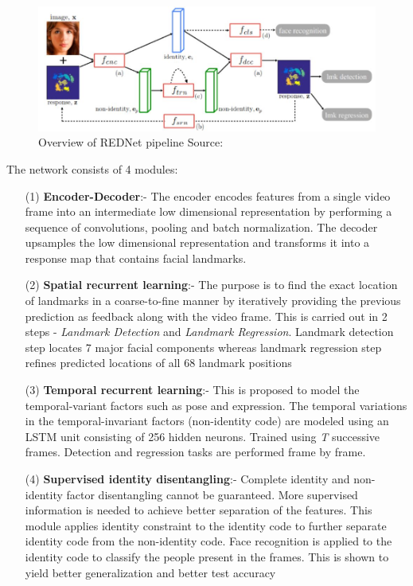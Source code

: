 \documentclass{llncs}
\begin{document}
\begin{figure}
\centering
\includegraphics[scale=0.5]{Media/rednet_architecture}
\caption{Overview of REDNet pipeline Source:\cite{rednet}}
\label{rednet_architecture}
\end{figure}

The network consists of 4 modules:
\begin{itemize}
\item[(1)] \textbf{Encoder-Decoder}:-
The encoder encodes features from a single video frame into an intermediate low dimensional representation by performing a sequence of convolutions, pooling and batch normalization. The decoder upsamples the low dimensional representation and transforms it into a response map that contains facial landmarks.
\item[(2)] \textbf{Spatial recurrent learning}:-
The purpose is to find the exact location of landmarks in a coarse-to-fine manner by iteratively providing the previous prediction as feedback along with the video frame. This is carried out in 2 steps - \textit{Landmark Detection} and \textit{Landmark Regression}. Landmark detection step locates 7 major facial components whereas landmark regression step refines predicted locations of all 68 landmark positions
\item[(3)] \textbf{Temporal recurrent learning}:-
This is proposed to model the temporal-variant factors such as pose and expression. The temporal variations in the temporal-invariant factors (non-identity code) are modeled using an LSTM unit consisting of 256 hidden neurons.
Trained using \textit{T} successive frames. Detection and regression tasks are performed frame by frame. 
\item[(4)] \textbf{Supervised identity disentangling}:-
Complete identity and non-identity factor disentangling cannot be guaranteed. More supervised information is needed to achieve better separation of the features. This module applies identity constraint to the identity code to further separate identity code from the non-identity code. Face recognition is applied to the identity code to classify the people present in the frames. This is shown to yield better generalization and better test accuracy\\
\end{itemize}
 
\end{document}
